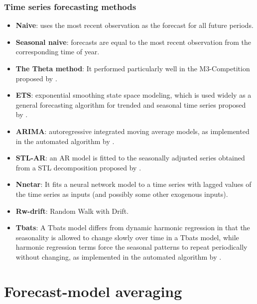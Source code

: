 \documentclass[10pt,aspectratio=43]{beamer}
\begin{document}
\begin{frame}
  \frametitle{Time series forecasting methods}

  \begin{itemize}
\item \textbf{Naive}: uses the most recent observation as the forecast for all future periods.

\item \textbf{Seasonal naive}: forecasts are equal to the most recent observation from the
  corresponding time of year.

\item \textbf{The Theta method}: It performed particularly well in the M3-Competition proposed by
  \citet{Assimakopoulos2000The}.

\item \textbf{ETS}: exponential smoothing state space modeling, which is used widely as a general
  forecasting algorithm for trended and seasonal time series proposed by
  \citet{Hyndman2017A}.

\item \textbf{ARIMA}: autoregressive integrated moving average models, as implemented in the
  automated algorithm by \citet{HK08}.

\item \textbf{STL-AR}: an AR model is fitted to the seasonally adjusted series obtained from a STL
  decomposition proposed by \citet{cleveland1990stl}.

\item \textbf{Nnetar}: It fits a neural network model to a time series with lagged values of the
  time series as inputs (and possibly some other exogenous inputs).

\item \textbf{Rw-drift}: Random Walk with Drift.

\item \textbf{Tbats}: A Tbats model differs from dynamic harmonic regression in that the
  seasonality is allowed to change slowly over time in a Tbats model, while harmonic
  regression terms force the seasonal patterns to repeat periodically without changing, as
  implemented in the automated algorithm by \citet{HK08}.
\end{itemize}
\end{frame}

\section{Forecast-model averaging}
\end{document}
